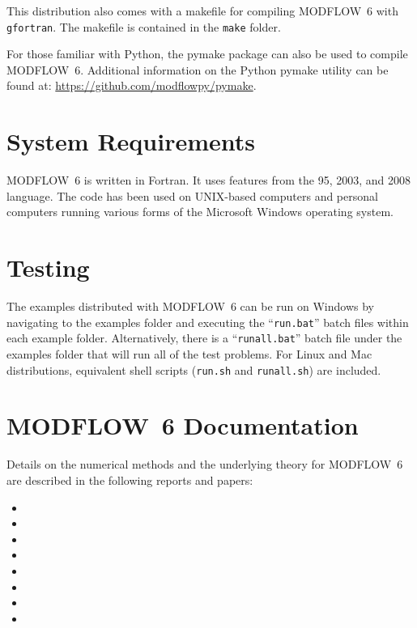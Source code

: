 \documentclass[11pt,twoside,twocolumn]{usgsreport}
\begin{document}
This distribution also comes with a makefile for compiling MODFLOW~6 with \texttt{gfortran}.  The makefile is contained in the \texttt{make} folder.

For those familiar with Python, the pymake package can also be used to compile MODFLOW~6.  Additional information on the Python pymake utility can be found at: \url{https://github.com/modflowpy/pymake}.  

\section{System Requirements}
MODFLOW~6 is written in Fortran.  It uses features from the 95, 2003, and 2008 language.  The code has been used on UNIX-based computers and personal computers running various forms of the Microsoft Windows operating system.

\section{Testing}
The examples distributed with MODFLOW~6 can be run on Windows by navigating to the examples folder and executing the ``\texttt{run.bat}'' batch files within each example folder.  Alternatively, there is a ``\texttt{runall.bat}'' batch file under the examples folder that will run all of the test problems.  For Linux and Mac distributions, equivalent shell scripts (\texttt{run.sh} and \texttt{runall.sh}) are included.

\section{MODFLOW~6 Documentation}
Details on the numerical methods and the underlying theory for MODFLOW~6 are described in the following reports and papers:

\begin{itemize}

\item {}

\item {}

\item {}

\item {}

\item {}

\item {}

\item {}

\item {}

\end{itemize}
 
\end{document}
